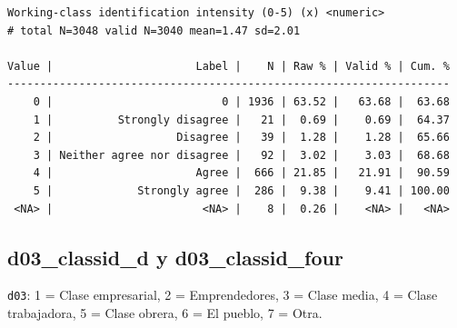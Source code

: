\documentclass[
  letterpaper,
  DIV=11,
  numbers=noendperiod]{scrreprt}
\newenvironment{Shaded}{\begin{snugshade}}{\end{snugshade}}
\newcommand{\AttributeTok}[1]{\textcolor[rgb]{0.40,0.45,0.13}{#1}}
\newcommand{\DecValTok}[1]{\textcolor[rgb]{0.68,0.00,0.00}{#1}}
\newcommand{\FunctionTok}[1]{\textcolor[rgb]{0.28,0.35,0.67}{#1}}
\newcommand{\NormalTok}[1]{\textcolor[rgb]{0.00,0.23,0.31}{#1}}
\newcommand{\OtherTok}[1]{\textcolor[rgb]{0.00,0.23,0.31}{#1}}
\newcommand{\SpecialCharTok}[1]{\textcolor[rgb]{0.37,0.37,0.37}{#1}}
\newcommand{\StringTok}[1]{\textcolor[rgb]{0.13,0.47,0.30}{#1}}
\begin{document}
\begin{Shaded}
\end{Shaded}

\begin{verbatim}
Working-class identification intensity (0-5) (x) <numeric> 
# total N=3048 valid N=3040 mean=1.47 sd=2.01

Value |                      Label |    N | Raw % | Valid % | Cum. %
--------------------------------------------------------------------
    0 |                          0 | 1936 | 63.52 |   63.68 |  63.68
    1 |          Strongly disagree |   21 |  0.69 |    0.69 |  64.37
    2 |                   Disagree |   39 |  1.28 |    1.28 |  65.66
    3 | Neither agree nor disagree |   92 |  3.02 |    3.03 |  68.68
    4 |                      Agree |  666 | 21.85 |   21.91 |  90.59
    5 |             Strongly agree |  286 |  9.38 |    9.41 | 100.00
 <NA> |                       <NA> |    8 |  0.26 |    <NA> |   <NA>
\end{verbatim}

\subsection{d03\_classid\_d y
d03\_classid\_four}\label{d03_classid_d-y-d03_classid_four}

\texttt{d03}: 1 = Clase empresarial, 2 = Emprendedores, 3 = Clase media,
4 = Clase trabajadora, 5 = Clase obrera, 6 = El pueblo, 7 = Otra.
\end{document}
